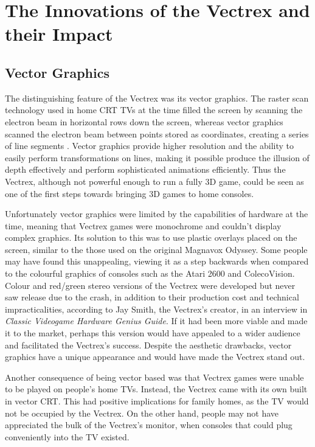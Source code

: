 \documentclass{scrartcl}
\begin{document}
\section*{The Innovations of the Vectrex and their Impact}


\subsection*{Vector Graphics}
The distinguishing feature of the Vectrex was its vector graphics. The raster scan technology used in home CRT TVs at the time filled the screen by scanning the electron beam in horizontal rows down the screen, whereas vector graphics scanned the electron beam between points stored as coordinates, creating a series of line segments \cite{wolf:medium}. Vector graphics provide higher resolution\cite{perron:theory} and the ability to easily perform transformations on lines, making it possible produce the illusion of depth effectively and perform sophisticated animations efficiently\cite{defanti:impact}. Thus the Vectrex, although not powerful enough to run a fully 3D game\cite{perron:theory}, could be seen as one of the first steps towards bringing 3D games to home consoles.

Unfortunately vector graphics were limited by the capabilities of hardware at the time, meaning that Vectrex games were monochrome and couldn't display complex graphics. Its solution to this was to use plastic overlays placed on the screen\cite{wolf:pong}, similar to the those used on the original Magnavox Odyssey. Some people may have found this unappealing, viewing it as a step backwards when compared to the colourful graphics of consoles such as the Atari 2600 and ColecoVision. Colour and red/green stereo versions of the Vectrex were developed\cite{defanti:impact} but never saw release due to the crash, in addition to their production cost and technical impracticalities, according to Jay Smith, the Vectrex's creator, in an interview in \textit{Classic Videogame Hardware Genius Guide}\cite{imagine:genius}. If it had been more viable and made it to the market, perhaps this version would have appealed to a wider audience and facilitated the Vectrex's success. Despite the aesthetic drawbacks, vector graphics have a unique appearance and would have made the Vectrex stand out. 

Another consequence of being vector based was that Vectrex games were unable to be played on people's home TVs. Instead, the Vectrex came with its own built in vector CRT\cite{vectrex:manual}. This had positive implications for family homes, as the TV would not be occupied by the Vectrex. On the other hand, people may not have appreciated the bulk of the Vectrex's monitor, when consoles that could plug conveniently into the TV existed.
\end{document}
